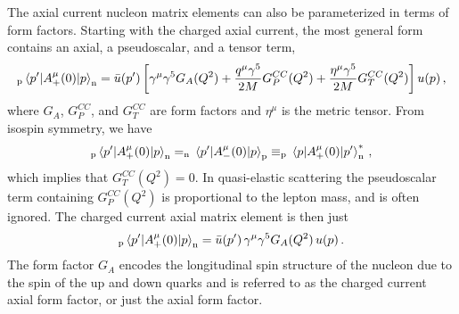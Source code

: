     The axial current nucleon matrix elements can also be parameterized in
    terms of form factors. Starting with the charged axial current, the most
    general form contains an axial, a pseudoscalar, and a tensor term,
    \begin{equation}
      _{\textrm{p}}\mel{p'}{A^{\mu}_+(0)}{p}_{\textrm{n}} 
        = \bar{u}(p') \left[\gamma^{\mu}\gamma^{5} G_A(Q^2) 
          + \frac{q^{\mu}\gamma^{5}}{2M}G_P^{CC}(Q^2) 
          + \frac{\eta^{\mu}\gamma^{5}}{2M}G_T^{CC}(Q^2)\right] u(p) \,,
    \end{equation}
    where $G_A$, $G_P^{CC}$, and $G_T^{CC}$ are form factors and $\eta^{\mu}$
    is the metric tensor. From isospin symmetry, we have
    \begin{equation}
      _{\textrm{p}}\mel{p'}{A^{\mu}_+(0)}{p}_{\textrm{n}} 
      = _{\textrm{n}}\mel{p'}{A^{\mu}_-(0)}{p}_{\textrm{p}} 
      \equiv _{\textrm{p}}\mel{p}{A^{\mu}_+(0)}{p'}_{\textrm{n}}^* \,,
    \end{equation}
    which implies that $G_T^{CC}(Q^2) = 0$. In quasi-elastic scattering the
    pseudoscalar term containing $G_P^{CC}(Q^2)$ is proportional to the lepton
    mass, and is often ignored. The charged current axial matrix element is then just
    \begin{equation}
      _{\textrm{p}}\mel{p'}{A^{\mu}_+(0)}{p}_{\textrm{n}} 
        = \bar{u}(p') \,\gamma^{\mu}\gamma^{5} G_A(Q^2)\, u(p) \,.
    \end{equation}
    The form factor $G_A$ encodes the longitudinal spin structure of the
    nucleon due to the spin of the up and down quarks and is referred to as the
    charged current axial form factor, or just the axial form factor.

